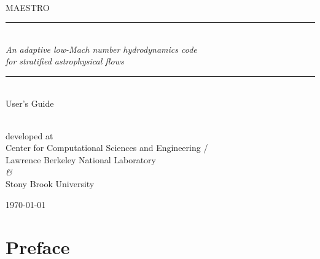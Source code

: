\documentclass[11pt]{book}    %
\newcommand{\HRule}{\rule{\linewidth}{0.125mm}}
\renewcommand{\chaptermark}[1]{%
 \markboth{\chaptername
\ \thechapter.\ #1}{}}
\begin{document}
\frontmatter


\begin{titlepage}

\begin{center}

\ \\[2 in]
{\sf \Huge MAESTRO} \\[0.25in]


\begin{minipage}{5.5in}
\HRule\\[2mm]
\centering
{\Large \em An adaptive low-Mach number hydrodynamics code\\ for stratified astrophysical flows}


\HRule
\end{minipage}

\ \\[1 in]
{\sf \huge User's Guide}

\ \\[1 in]
{developed at \\[5mm] Center for Computational Sciences and Engineering / \\ Lawrence Berkeley National Laboratory \\[3mm]
  {\em \&}  \\[3mm]
        Stony Brook University}

\vfill

{\large \today}

\end{center}

\end{titlepage}



\setcounter{tocdepth}{2}
\tableofcontents

\clearpage

\listoffigures
{}

\clearpage

\listoftables
{}


\clearpage

\chapter*{Preface}
\chaptermark{Preface}


\clearpage
\end{document}
